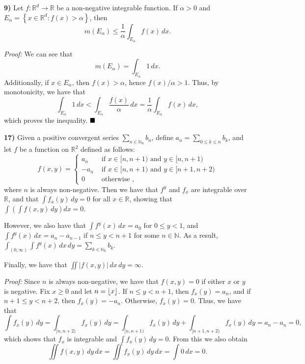 \documentclass[12pt]{article}
\newcommand{\N}{\ensuremath{\mathbb{N}}}
\newcommand{\R}{\ensuremath{\mathbb{R}}}
\newcommand{\braceb}[1]{\left\{#1\right\}}
\newcommand{\parenb}[1]{\left(#1\right)}
\newcommand{\vertb}[1]{\left\vert#1\right\vert}
\DeclarePairedDelimiter\floor{\lfloor}{\rfloor}
\newcommand{\proof}{\textit{Proof: }}
\newcommand{\done}{\ensuremath{\strut\hfill\blacksquare}}
\renewcommand{\t}[1]{\text{ #1 }}
\newcommand{\sectionskip}{\vspace{0.15in}}
\begin{document}
\pagestyle{fancy}

\setlength{\parindent}{0in}
\setlength{\parskip}{0.1in}

\textbf{9)}
Let \( f : \R^d \to \R \) be a non-negative integrable function.
If \( \alpha > 0 \) and \break
\( E_\alpha = \braceb{x \in \R^d : f(x) > \alpha } \),
then
\[
	m(E_\alpha)
	\leq \frac{1}{\alpha} \int_{E_\alpha} f(x) \, dx.
\]

\proof
We can see that
\[
	m(E_\alpha)
	= \int_{E_\alpha} 1 \, dx.
\]
Additionally, if \( x \in E_\alpha \), then \( f(x) > \alpha \), hence
\( f(x) / \alpha > 1 \).
Thus, by monotonicity, we have that
\[
	\int_{E_\alpha} 1 \, dx
	< \int_{E_\alpha} \frac{f(x)}{\alpha} \, dx
	= \frac{1}{\alpha} \int_{E_\alpha} f(x) \, dx,
\]
which proves the inequality.
\done

\sectionskip

\textbf{17)}
Given a positive convergent series \( \sum_{n \in \N_0} b_n \), define
\( a_n = \sum_{0 \leq k \leq n} b_k \), and let \( f \) be a function on
\( \R^2 \) defined as follows:
\[
	f(x,y) = \begin{cases}
		a_n  & \t{if} x \in [n, n + 1) \t{and} y \in [n, n + 1)     \\
		-a_n & \t{if} x \in [n, n + 1) \t{and} y \in [n + 1, n + 2) \\
		0    & \t{otherwise},
	\end{cases}
\]
where \( n \) is always non-negative.
Then we have that \( f^y \) and \( f_x \) are integrable over \R, and
that \( \int f_x(y) \, dy = 0 \) for all \( x \in \R \), showing that
\( \int \parenb{\int f(x,y) \, dy} dx = 0 \).

However, we also have that \( \int f^y(x) \, dx = a_0 \) for
\( 0 \leq y < 1 \), and \( \int f^y(x) \, dx = a_n - a_{n - 1} \) if
\( n \leq y < n + 1 \) for some \( n \in \N \).
As a result,
\( \int_{(0,\infty)} \int f^y(x) \, dx \, dy = \sum_{k \in \N_0} b_k \).

Finally, we have that \( \iint \vertb{f(x,y)} \, dx \, dy = \infty \).

\proof
Since \( n \) is always non-negative, we have that \( f(x,y) = 0 \) if
either \( x \) or \( y \) is negative.
Fix \( x \geq 0 \) and let \( n = \floor{x} \).
If \( n \leq y < n + 1 \), then \( f_x(y) = a_n \), and if
\( n + 1 \leq y < n + 2 \), then \( f_x(y) = -a_n \).
Otherwise, \( f_x(y) = 0 \).
Thus, we have that
\[
	\int f_x(y) \, dy
	= \int_{[n, n + 2)} f_x(y) \, dy
	= \int_{[n, n + 1)} f_x(y) \, dy + \int_{[n + 1, n + 2)} f_x(y) \, dy
	= a_n - a_n
	= 0,
\]
which shows that \( f_x \) is integrable and \( \int f_x(y) \, dy = 0 \).
From this we also obtain
\[
	\iint f(x,y) \, dy \, dx
	= \iint f_x(y) \, dy \, dx
	= \int 0 \, dx
	= 0.
\]
\end{document}
